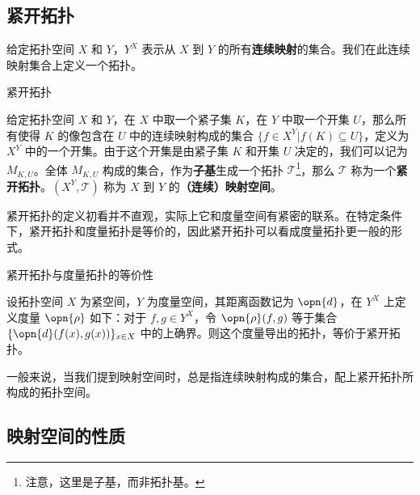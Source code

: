
\subsection{紧开拓扑}

给定拓扑空间 $X$ 和 $Y$，$Y^X$ 表示从 $X$ 到 $Y$ 的所有\textbf{连续映射}的集合。我们在此连续映射集合上定义一个拓扑。

\begin{definition}{紧开拓扑}

给定拓扑空间 $X$ 和 $Y$，在 $X$ 中取一个紧子集 $K$，在 $Y$ 中取一个开集 $U$，那么所有使得 $K$ 的像包含在 $U$ 中的连续映射构成的集合 $\{f\in X^Y|f(K)\subseteq U\}$，定义为 $X^Y$ 中的一个开集。由于这个开集是由紧子集 $K$ 和开集 $U$ 决定的，我们可以记为 $M_{K, U}$。全体 $M_{K, U}$ 构成的集合，作为\textbf{子基}生成一个拓扑 $\mathcal{T}$\footnote{注意，这里是子基，而非拓扑基。}，那么 $\mathcal{T}$ 称为一个\textbf{紧开拓扑}。$(X^Y, \mathcal{T})$ 称为 $X$ 到 $Y$ 的\textbf{（连续）映射空间}。

\end{definition}

紧开拓扑的定义初看并不直观，实际上它和度量空间有紧密的联系。在特定条件下，紧开拓扑和度量拓扑是等价的，因此紧开拓扑可以看成度量拓扑更一般的形式。

\begin{theorem}{紧开拓扑与度量拓扑的等价性}

设拓扑空间 $X$ 为紧空间，$Y$ 为度量空间，其距离函数记为 $\opn{d}$，在 $Y^X$ 上定义度量 $\opn{\rho}$ 如下：对于 $f, g\in Y^X$，令 $\opn{\rho}(f, g)$ 等于集合 $\{\opn{d}(f(x), g(x))\}_{x\in X}$ 中的上确界。则这个度量导出的拓扑，等价于紧开拓扑。

\end{theorem}

一般来说，当我们提到映射空间时，总是指连续映射构成的集合，配上紧开拓扑所构成的拓扑空间。

\subsection{映射空间的性质}

